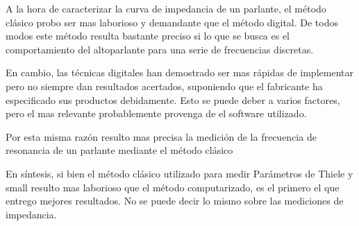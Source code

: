 \documentclass[]{article}
\begin{document}
\begin{multicols}{2}
A la hora de caracterizar la curva de impedancia de un parlante, el método
clásico probo ser mas laborioso y demandante que el método digital. De todos modos
este método resulta bastante preciso si lo que se busca es el comportamiento del
altoparlante para una serie de frecuencias discretas.

En cambio, las técnicas digitales han demostrado ser mas rápidas de implementar
pero no siempre dan resultados acertados, suponiendo que el fabricante ha especificado
sus productos debidamente. Esto se puede deber a varios factores, pero el mas
relevante probablemente provenga de el software utilizado.

Por esta misma razón resulto mas precisa la medición de la frecuencia de resonancia
de un parlante mediante el método clásico

En síntesis, si bien el método clásico utilizado para medir Parámetros de Thiele y small
resulto mas laborioso que el método computarizado, es el primero el que entrego
mejores resultados. No se puede decir lo mismo sobre las mediciones de impedancia.
\printbibliography

\end{multicols}
\end{document}
